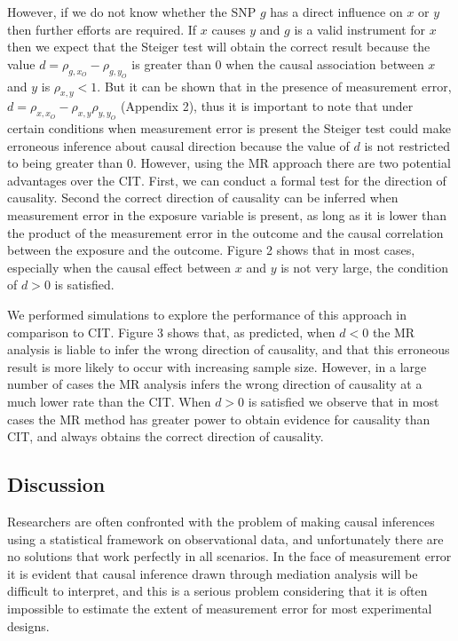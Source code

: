\documentclass[]{article}
\begin{document}
However, if we do not know whether the SNP \(g\) has a direct influence
on \(x\) or \(y\) then further efforts are required. If \(x\) causes
\(y\) and \(g\) is a valid instrument for \(x\) then we expect that the
Steiger test will obtain the correct result because the value
\(d = \rho_{g, x_O} - \rho_{g, y_O}\) is greater than 0 when the causal
association between \(x\) and \(y\) is \(\rho_{x, y} < 1\). But it can
be shown that in the presence of measurement error,
\(d = \rho_{x, x_O} - \rho_{x,y}\rho_{y,y_O}\) (Appendix 2), thus it is
important to note that under certain conditions when measurement error
is present the Steiger test could make erroneous inference about causal
direction because the value of \(d\) is not restricted to being greater
than 0. However, using the MR approach there are two potential
advantages over the CIT. First, we can conduct a formal test for the
direction of causality. Second the correct direction of causality can be
inferred when measurement error in the exposure variable is present, as
long as it is lower than the product of the measurement error in the
outcome and the causal correlation between the exposure and the outcome.
Figure 2 shows that in most cases, especially when the causal effect
between \(x\) and \(y\) is not very large, the condition of \(d > 0\) is
satisfied.

We performed simulations to explore the performance of this approach in
comparison to CIT. Figure 3 shows that, as predicted, when \(d < 0\) the
MR analysis is liable to infer the wrong direction of causality, and
that this erroneous result is more likely to occur with increasing
sample size. However, in a large number of cases the MR analysis infers
the wrong direction of causality at a much lower rate than the CIT. When
\(d > 0\) is satisfied we observe that in most cases the MR method has
greater power to obtain evidence for causality than CIT, and always
obtains the correct direction of causality.

\subsection{Discussion}\label{discussion}

Researchers are often confronted with the problem of making causal
inferences using a statistical framework on observational data, and
unfortunately there are no solutions that work perfectly in all
scenarios. In the face of measurement error it is evident that causal
inference drawn through mediation analysis will be difficult to
interpret, and this is a serious problem considering that it is often
impossible to estimate the extent of measurement error for most
experimental designs.
\end{document}
